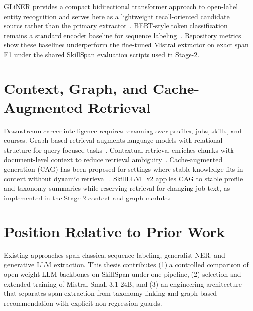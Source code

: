 GLiNER provides a compact bidirectional transformer approach to open-label entity recognition and serves here as a lightweight recall-oriented candidate source rather than the primary extractor~\cite{zaratiana2024gliner}.
BERT-style token classification remains a standard encoder baseline for sequence labeling~\cite{devlin2019bert}.
Repository metrics show these baselines underperform the fine-tuned Mistral extractor on exact span F1 under the shared SkillSpan evaluation scripts used in Stage-2.

\section{Context, Graph, and Cache-Augmented Retrieval}

Downstream career intelligence requires reasoning over profiles, jobs, skills, and courses.
Graph-based retrieval augments language models with relational structure for query-focused tasks~\cite{edge2024graphrag}.
Contextual retrieval enriches chunks with document-level context to reduce retrieval ambiguity~\cite{anthropic2024contextualretrieval}.
Cache-augmented generation (CAG) has been proposed for settings where stable knowledge fits in context without dynamic retrieval~\cite{chan2025cag}.
SkillLLM\_v2 applies CAG to stable profile and taxonomy summaries while reserving retrieval for changing job text, as implemented in the Stage-2 context and graph modules.

\section{Position Relative to Prior Work}

Existing approaches span classical sequence labeling, generalist NER, and generative LLM extraction.
This thesis contributes (1) a controlled comparison of open-weight LLM backbones on SkillSpan under one pipeline, (2) selection and extended training of Mistral Small 3.1 24B, and (3) an engineering architecture that separates span extraction from taxonomy linking and graph-based recommendation with explicit non-regression guards.
